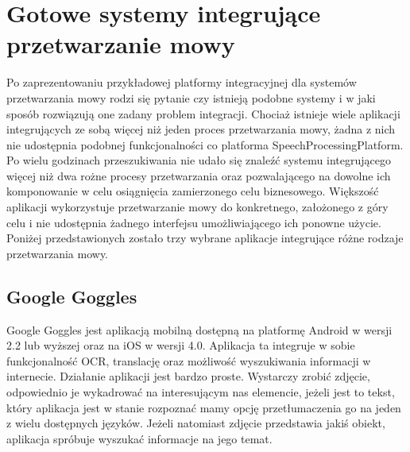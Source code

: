 


\ifpdf
    \graphicspath{{5/figures/PNG/}{5/figures/PDF/}{5/figures/}}
\else
    \graphicspath{{5/figures/EPS/}{5/figures/}}
\fi

\chapter{Gotowe systemy integrujące przetwarzanie mowy} %

Po zaprezentowaniu przykładowej platformy integracyjnej dla systemów przetwarzania mowy rodzi się pytanie czy istnieją podobne systemy i w jaki sposób rozwiązują one zadany problem integracji. Chociaż istnieje wiele aplikacji integrujących ze sobą więcej niż jeden proces przetwarzania mowy, żadna z nich nie udostępnia podobnej funkcjonalności co platforma SpeechProcessingPlatform. Po wielu godzinach przeszukiwania nie udało się znaleźć systemu integrującego więcej niż dwa rożne procesy przetwarzania oraz pozwalającego na dowolne ich komponowanie w celu osiągnięcia zamierzonego celu biznesowego. Większość aplikacji wykorzystuje przetwarzanie mowy do konkretnego, założonego z góry celu i nie udostępnia żadnego interfejsu umożliwiającego ich ponowne użycie. Poniżej przedstawionych zostało trzy wybrane aplikacje integrujące różne rodzaje przetwarzania mowy.

\section {Google Goggles}

Google Goggles\cite{googlegoggles} jest aplikacją mobilną dostępną na platformę Android w wersji 2.2 lub wyższej oraz na iOS w wersji 4.0. Aplikacja ta integruje w sobie funkcjonalność OCR, translację oraz możliwość wyszukiwania informacji w internecie. Działanie aplikacji jest bardzo proste. Wystarczy zrobić zdjęcie, odpowiednio je wykadrować na interesującym nas elemencie, jeżeli jest to tekst, który aplikacja jest w stanie rozpoznać mamy opcję przetłumaczenia go na jeden z wielu dostępnych języków. Jeżeli natomiast zdjęcie przedstawia jakiś obiekt, aplikacja spróbuje wyszukać informacje na jego temat.	

